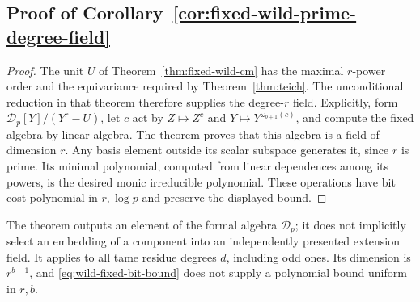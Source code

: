\documentclass[11pt]{article}
\theoremstyle{definition}
\theoremstyle{remark}
\begin{document}
\subsection*{Proof of Corollary~\ref{cor:fixed-wild-prime-degree-field}}
\begin{proof}
The unit \(U\) of Theorem~\ref{thm:fixed-wild-cm} has the
maximal \(r\)-power order and the equivariance required by
Theorem~\ref{thm:teich}. The unconditional reduction in that
theorem therefore supplies the degree-\(r\) field. Explicitly, form
\(\mathcal D_p[Y]/(Y^r-U)\), let \(c\) act by
\(Z\mapsto Z^c\) and \(Y\mapsto Y^{\omega_{b+1}(c)}\),
and compute the fixed algebra by linear algebra. The theorem
proves that this algebra is a field of dimension \(r\).
Any basis element outside its scalar subspace generates it,
since \(r\) is prime. Its minimal polynomial, computed from
linear dependences among its powers, is the desired monic
irreducible polynomial. These operations have bit cost
polynomial in \(r,\log p\) and preserve the displayed bound.
\end{proof}

The theorem outputs an element of the formal algebra
\(\mathcal D_p\); it does not implicitly select an embedding of
a component into an independently presented extension field.
It applies to all tame residue degrees \(d\), including odd
ones. Its dimension is \(r^{b-1}\), and \eqref{eq:wild-fixed-bit-bound} does not supply a
polynomial bound uniform in \(r,b\).
\end{document}
